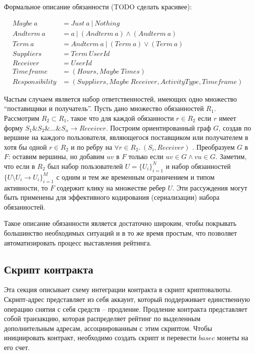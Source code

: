 \documentclass[specification,annotation]{itmo-student-thesis}
\begin{document}
Формальное описание обязанности (TODO сделать красивее):

\begin{align*}
Maybe \ a &= Just \ a \ | \ Nothing \\
Andterm \ a &= a \ | \ (Andterm \ a) \wedge (Andterm \ a) \\
Term \ a &= Andterm \ a \ | \ (Term \ a) \vee (Term \ a) \\
Suppliers &= Term \ UserId\\
Receiver &= UserId\\
Timeframe &= (Hours, Maybe \ Times) \\
Responsibility &= (Suppliers, Maybe \ Receiver, ActivityType, Timeframe)
\end{align*}

Частым случаем является набор ответственностей, имеющих одно множество
``поставищики и получатель''. Пусть дано множество обязанностей
$R_1$. Рассмотрим $R_2 \subset R_1$, такое что для каждой обязанности
$r \in R_2$ если $r$ имеет форму $S_1\&S_2\&…\&S_n \rightarrow
Receiver$. Построим ориентированный граф $G$, создав по вершине на
каждого пользователя, являющегося поставщиком или получателем в хотя
бы одной $r \in R_2$ и по ребру на $\forall r \in R_2. \ (S_i,
Receiver)$ . Преобразуем $G$ в $F$: оставим вершины, но добавим
$uv$ в $F$ только если $uv \in G \wedge vu \in G$. Заметим, что если в
$R_2$ был набор пользователей $U = \{U_i\}_{i=1}^N$ и набор
обязанностей $\{U \setminus U_i \rightarrow U_i\}_{i=1}^M$ с одним и
тем же временным ограничением и типом активности, то $F$ содержит
клику на множестве ребер $U$. Эти рассуждения могут быть применены для
эффективного кодирования (сериализации) набора обязанностей.

Такое описание обязанности является достаточно широким, чтобы
покрывать большинство необходимых ситуаций и в то же время простым,
что позволяет автоматизировать процесс выставления рейтинга.

\subsection{Скрипт контракта}

Эта секция описывает схему интеграции контракта в скрипт
криптовалюты. Скрипт-адрес представляет из себя аккаунт, который
поддерживает единственную операцию снятия с себя средств --
продление. Продление контракта представляет собой транзакцию, которая
распределяет рейтинг по выделенным дополнительным адресам,
ассоциированным с этим скриптом. Чтобы инициировать контракт,
необходимо создать скрипт и перевести $basec$ монеты на его счет.
\end{document}
